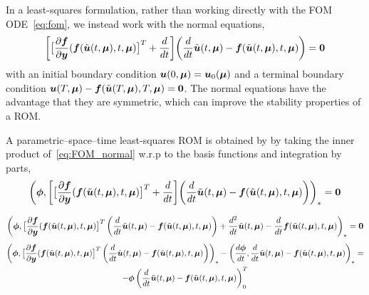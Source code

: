 \documentclass[3p,computermodern,10pt]{elsarticle}
\begin{document}
In a least-squares formulation, rather than working directly with the FOM ODE~\eqref{eq:fom}, we instead work with the normal equations,
\begin{equation}\label{eq:FOM_normal}
 \bigg[\big[\frac{\partial \boldsymbol f}{\partial \boldsymbol y}(  \boldsymbol f(\tilde{\boldsymbol u}(t,\boldsymbol \mu),t,\boldsymbol \mu)  \big]^T  + \frac{d}{dt} \bigg] \bigg( \frac{d}{dt}\tilde{\boldsymbol u}(t,\boldsymbol \mu) -   \boldsymbol f(\tilde{\boldsymbol u}(t,\boldsymbol \mu),t,\boldsymbol \mu) \bigg) = \boldsymbol 0
\end{equation} 
with an initial boundary condition $\boldsymbol u(0,\boldsymbol \mu) = \boldsymbol u_0(\boldsymbol \mu)$ and a terminal boundary condition $\boldsymbol u(T,\boldsymbol \mu) -   \boldsymbol f(\tilde{\boldsymbol u}(T,\boldsymbol \mu),T,\boldsymbol \mu) = \boldsymbol 0$. The normal equations have the advantage that they are symmetric, which can improve the stability properties of a ROM.

A parametric--space--time least-squares ROM is obtained by by taking the inner product of~\eqref{eq:FOM_normal} w.r.p to the basis functions and integration by parts,
 \begin{equation}\label{eq:ROM_normal1}
\left(  \boldsymbol \phi,  \bigg[\big[\frac{\partial \boldsymbol f}{\partial \boldsymbol y}(  \boldsymbol f(\tilde{\boldsymbol u}(t,\boldsymbol \mu),t,\boldsymbol \mu)  \big]^T  + \frac{d}{dt} \bigg] \bigg( \frac{d}{dt}\tilde{\boldsymbol u}(t,\boldsymbol \mu) -   \boldsymbol f(\tilde{\boldsymbol u}(t,\boldsymbol \mu),t,\boldsymbol \mu) \bigg) \right)_{*} = \boldsymbol 0
\end{equation} 

 \begin{equation}\label{eq:ROM_normal1}
\left(  \boldsymbol \phi,  \big[\frac{\partial \boldsymbol f}{\partial \boldsymbol y}(  \boldsymbol f(\tilde{\boldsymbol u}(t,\boldsymbol \mu),t,\boldsymbol \mu)  \big]^T  \left( \frac{d}{dt} \tilde{\boldsymbol u}(t,\boldsymbol \mu)  -   \boldsymbol f(\tilde{\boldsymbol u}(t,\boldsymbol \mu),t,\boldsymbol \mu) \right) + \frac{d^2}{dt} \tilde{\boldsymbol u}(t,\boldsymbol \mu) - \frac{d}{dt}  \boldsymbol f(\tilde{\boldsymbol u}(t,\boldsymbol \mu),t,\boldsymbol \mu)   \right)_{*} 
 = \boldsymbol 0
\end{equation} 
 \begin{multline}\label{eq:ROM_normal2}
\left(  \boldsymbol \phi,  \big[\frac{\partial \boldsymbol f}{\partial \boldsymbol y}(  \boldsymbol f(\tilde{\boldsymbol u}(t,\boldsymbol \mu),t,\boldsymbol \mu)  \big]^T  \left( \frac{d}{dt} \tilde{\boldsymbol u}(t,\boldsymbol \mu)  -   \boldsymbol f(\tilde{\boldsymbol u}(t,\boldsymbol \mu),t,\boldsymbol \mu) \right) \right)_{*} 
- \left( \frac{d \boldsymbol \phi}{dt},  \frac{d}{dt} \tilde{\boldsymbol u}(t,\boldsymbol \mu) -  \boldsymbol f(\tilde{\boldsymbol u}(t,\boldsymbol \mu),t,\boldsymbol \mu)   \right)_{*} 
 =  \\
-  \boldsymbol \phi \left( \frac{d}{dt} \tilde{\boldsymbol u}(t,\boldsymbol \mu)   - \boldsymbol f(\tilde{\boldsymbol u}(t,\boldsymbol \mu),t,\boldsymbol \mu) \right)_0^T
\end{multline} 
\end{document}
